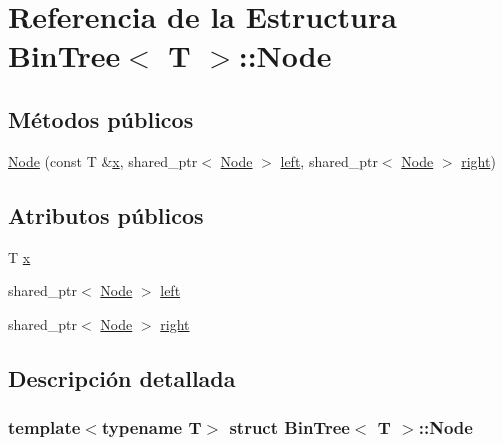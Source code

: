 \hypertarget{struct_bin_tree_1_1_node}{}\section{Referencia de la Estructura Bin\+Tree$<$ T $>$\+:\+:Node}
\label{struct_bin_tree_1_1_node}
\subsection*{Métodos públicos}
\begin{DoxyCompactItemize}
\item 
\mbox{\hyperlink{struct_bin_tree_1_1_node_af45885e303875c018e89fa5c8b96bde0}{Node}} (const T \&\mbox{\hyperlink{struct_bin_tree_1_1_node_a9c268d4af01559e8237dbeb5bd19af91}{x}}, shared\+\_\+ptr$<$ \mbox{\hyperlink{struct_bin_tree_1_1_node}{Node}} $>$ \mbox{\hyperlink{struct_bin_tree_1_1_node_a265a6367635a38838e6a6366564be78d}{left}}, shared\+\_\+ptr$<$ \mbox{\hyperlink{struct_bin_tree_1_1_node}{Node}} $>$ \mbox{\hyperlink{struct_bin_tree_1_1_node_a6df770137090da60cd0376ce06893cbd}{right}})
\end{DoxyCompactItemize}
\subsection*{Atributos públicos}
\begin{DoxyCompactItemize}
\item 
T \mbox{\hyperlink{struct_bin_tree_1_1_node_a9c268d4af01559e8237dbeb5bd19af91}{x}}
\item 
shared\+\_\+ptr$<$ \mbox{\hyperlink{struct_bin_tree_1_1_node}{Node}} $>$ \mbox{\hyperlink{struct_bin_tree_1_1_node_a265a6367635a38838e6a6366564be78d}{left}}
\item 
shared\+\_\+ptr$<$ \mbox{\hyperlink{struct_bin_tree_1_1_node}{Node}} $>$ \mbox{\hyperlink{struct_bin_tree_1_1_node_a6df770137090da60cd0376ce06893cbd}{right}}
\end{DoxyCompactItemize}


\subsection{Descripción detallada}
\subsubsection*{template$<$typename T$>$\newline
struct Bin\+Tree$<$ T $>$\+::\+Node}




